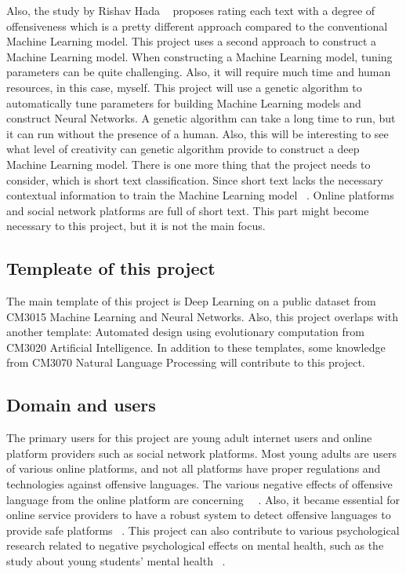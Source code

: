 \documentclass[11pt, natbib=false]{article}
\begin{document}
Also, the study by Rishav Hada ~\cite{hada2021ruddit} proposes rating each text with a degree of offensiveness which is a pretty different approach compared to the conventional Machine Learning model.
This project uses a second approach to construct a Machine Learning model.
When constructing a Machine Learning model, tuning parameters can be quite challenging.
Also, it will require much time and human resources, in this case, myself.
This project will use a genetic algorithm to automatically tune parameters for building Machine Learning models and construct Neural Networks.
A genetic algorithm can take a long time to run, but it can run without the presence of a human.
Also, this will be interesting to see what level of creativity can genetic algorithm provide to construct a deep Machine Learning model.
There is one more thing that the project needs to consider, which is short text classification.
Since short text lacks the necessary contextual information to train the Machine Learning model ~\cite{wang2021short}.
Online platforms and social network platforms are full of short text.
This part might become necessary to this project, but it is not the main focus. 

\subsection{Templeate of this project}
The main template of this project is Deep Learning on a public dataset from CM3015 Machine Learning and Neural Networks. Also, this project overlaps with another template: Automated design using evolutionary computation from CM3020 Artificial Intelligence. In addition to these templates, some knowledge from CM3070 Natural Language Processing will contribute to this project. 

\subsection{Domain and users}
The primary users for this project are young adult internet users and online platform providers such as social network platforms.
Most young adults are users of various online platforms, and not all platforms have proper regulations and technologies against offensive languages.
The various negative effects of offensive language from the online platform are concerning ~\cite{babvey2021using}~\cite{shi2021influence}.
Also, it became essential for online service providers to have a robust system to detect offensive languages to provide safe platforms ~\cite{vidgen2019challenges}.
This project can also contribute to various psychological research related to negative psychological effects on mental health, such as the study about young students’ mental health ~\cite{shi2021influence}.
\end{document}
